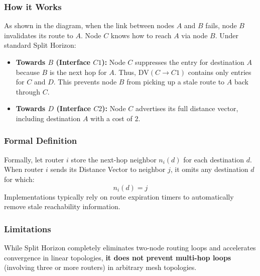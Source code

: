 \begin{center}
\end{center}

\subsubsection*{How it Works}
As shown in the diagram, when the link between nodes $A$ and $B$ fails, node $B$ invalidates its route to $A$. Node $C$ knows how to reach $A$ via node $B$. Under standard Split Horizon:
\begin{itemize}
	\item \textbf{Towards $B$ (Interface $C1$):} Node $C$ suppresses the entry for destination $A$ because $B$ is the next hop for $A$. Thus, $\text{DV}(C \to C1)$ contains only entries for $C$ and $D$. This prevents node $B$ from picking up a stale route to $A$ back through $C$.
	\item \textbf{Towards $D$ (Interface $C2$):} Node $C$ advertises its full distance vector, including destination $A$ with a cost of $2$.
\end{itemize}

\subsubsection*{Formal Definition}
Formally, let router $i$ store the next-hop neighbor $n_i(d)$ for each destination $d$. When router $i$ sends its Distance Vector to neighbor $j$, it omits any destination $d$ for which:
\[
n_i(d) = j
\]
Implementations typically rely on route expiration timers to automatically remove stale reachability information.

\subsubsection*{Limitations}
While Split Horizon completely eliminates two-node routing loops and accelerates convergence in linear topologies, \textbf{it does not prevent multi-hop loops} (involving three or more routers) in arbitrary mesh topologies.

\begin{figure}[htbp]
	\centering
	\label{fig:image33}
	
	\vspace{0.005cm} %
	
	\label{fig:image_seconda}
\end{figure}

